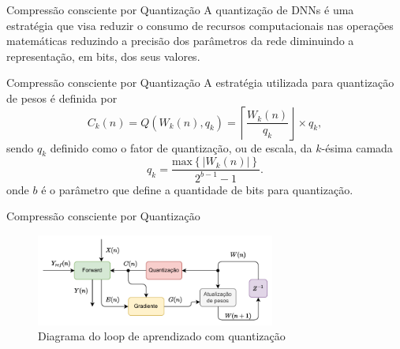 \begin{frame}{Compressão consciente por Quantização}
    A quantização de DNNs é uma estratégia que visa reduzir o consumo de recursos computacionais nas operações matemáticas reduzindo a precisão dos parâmetros da rede diminuindo a representação, em bits, dos seus valores.
    
\end{frame}


\begin{frame}{Compressão consciente por Quantização}
    A estratégia utilizada para quantização de pesos é definida por 
\begin{equation}\label{EqQuantization}
    C_k(n) = Q\left (W_k(n) , q_k\right)= \left \lceil \frac{W_k(n)}{q_k} \right \rfloor \times q_k,
\end{equation}
    sendo $q_k$ definido como o fator de quantização, ou de escala, da $k$-ésima camada 
\begin{equation}
    q_k = \frac{\text{max} \left \{ \left | W_k(n) \right | \right \}}{2^{b-1}-1}.
    \label{ft_quant}
\end{equation}
    onde $b$ é o parâmetro que define a quantidade de bits para quantização.
\end{frame}

\begin{frame}{Compressão consciente por Quantização}
    \begin{figure}[H]
    \centering
    \includegraphics[width=0.7\textwidth]{figuras/quantization_scheme.pdf}
    \caption{Diagrama do loop de aprendizado com quantização}
    \end{figure}
\end{frame}

